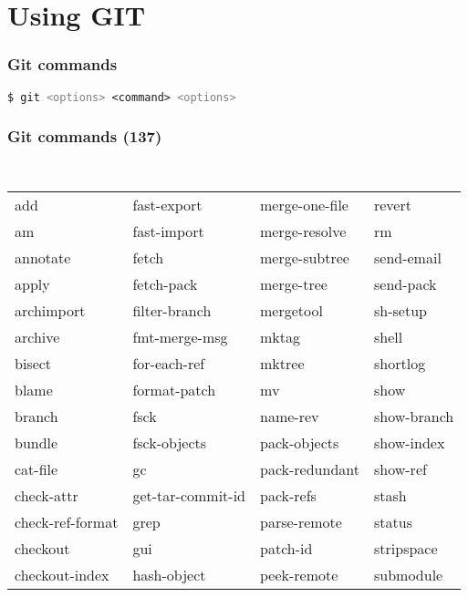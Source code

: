 \documentclass[english]{beamer}
\newcommand{\mysection}[2]{
  \hypertarget{#2}{}
  \section{#1}
  \label{#2}
}
\newcommand{\CMD}[1]{
  \texttt{\textcolor{code-green}{#1}}
}
\begin{document}
\mysection{Using GIT}{_using_git}
\begin{frame}
\frametitle{Git commands}

\CMD{\$ git 
\textcolor{gray}{<options>}
<command>
\textcolor{gray}{<options>}}

\end{frame}

\begin{frame}[fragile]
\frametitle{Git commands (137)}
{\tiny \tt
\begin{tabular}{llll}
add               & fast-export       & merge-one-file & revert             \\
am                & fast-import       & merge-resolve  & rm                 \\
annotate          & fetch             & merge-subtree  & send-email         \\
apply             & fetch-pack        & merge-tree     & send-pack          \\
archimport        & filter-branch     & mergetool      & sh-setup           \\
archive           & fmt-merge-msg     & mktag          & shell              \\
bisect            & for-each-ref      & mktree         & shortlog           \\
blame             & format-patch      & mv             & show               \\
branch            & fsck              & name-rev       & show-branch        \\
bundle            & fsck-objects      & pack-objects   & show-index         \\
cat-file          & gc                & pack-redundant & show-ref           \\
check-attr        & get-tar-commit-id & pack-refs      & stash              \\
check-ref-format  & grep              & parse-remote   & status             \\
checkout          & gui               & patch-id       & stripspace         \\
checkout-index    & hash-object       & peek-remote    & submodule          \\

\end{tabular}}
\end{frame}
\end{document}
